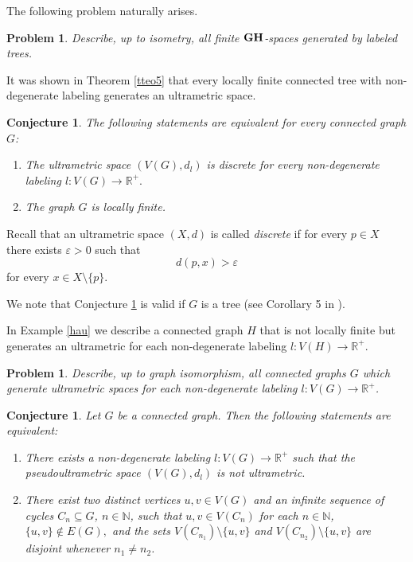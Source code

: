 \documentclass[pdflatex,sn-mathphys-num]{sn-jnl}%
\theoremstyle{thmstyleone}%
\newtheorem{Conjecture}[Theorem]{Conjecture}
\newtheorem{Problem}[Theorem]{Problem}
\theoremstyle{thmstyletwo}%
\theoremstyle{thmstylethree}%
\theoremstyle{thmstyletwo}%
\theoremstyle{thmstylethree}%
\begin{document}
The following problem naturally arises.

\begin{Problem}
Describe, up to isometry, all finite $\bf GH$-spaces generated by labeled trees.
\end{Problem}


It was shown in Theorem \ref{tteo5} that every locally finite connected tree with non-degenerate labeling generates an ultrametric space.

\begin{Conjecture}\label{rama} The following statements are equivalent for every connected graph $G$:
\begin{enumerate}
\item[(i)] The ultrametric space $(V(G), d_l)$ is discrete for every non-degenerate labeling
\(
l : V(G) \to \mathbb{R}^+.
\)
\item[(ii)] The graph $G$ is locally finite.
\end{enumerate}
\end{Conjecture}

Recall that an ultrametric space $(X,d)$ is called {\it discrete} if for every $p \in X$ there exists $\varepsilon > 0$ such that
\begin{equation*}
d(p,x) > \varepsilon
\end{equation*}
 for every $ x \in X \setminus \{p\}$.


We note that Conjecture \ref{rama} is valid if $G$ is a tree (see Corollary 5 in \cite{DK2022LTGCCaDUS}).

In Example \ref{hau} we describe a connected graph $H$ that is not locally finite but generates an ultrametric
for each non-degenerate labeling $l : V(H) \to \mathbb{R}^+$.

\begin{Problem} Describe, up to graph isomorphism, all connected graphs $G$ which generate ultrametric spaces for each non-degenerate labeling $l : V(G) \to \mathbb{R}^+$.
\end{Problem}


\begin{Conjecture}\label{pak} Let $G$ be a connected graph. Then the following statements are equivalent:
\begin{enumerate}
    \item[(i)] There exists a non-degenerate labeling $l : V(G) \to \mathbb{R}^+$ such that the pseudoultrametric space $(V(G), d_l)$ is not ultrametric.
\item[(ii)] There exist two distinct vertices $u, v \in V(G)$ and an infinite sequence of cycles $C_n \subseteq G$, $n \in \mathbb{N}$, such that
\(
u, v \in V(C_n) 
\)
for each $ n \in \mathbb{N}$,
\(
\{u,v\} \notin E(G),
\)
and the sets
\(
V(C_{n_1}) \setminus \{u,v\}\) and \(V(C_{n_2}) \setminus \{u,v\}
\)
are disjoint whenever $n_1 \neq n_2$.
\end{enumerate}
\end{Conjecture}
\end{document}
